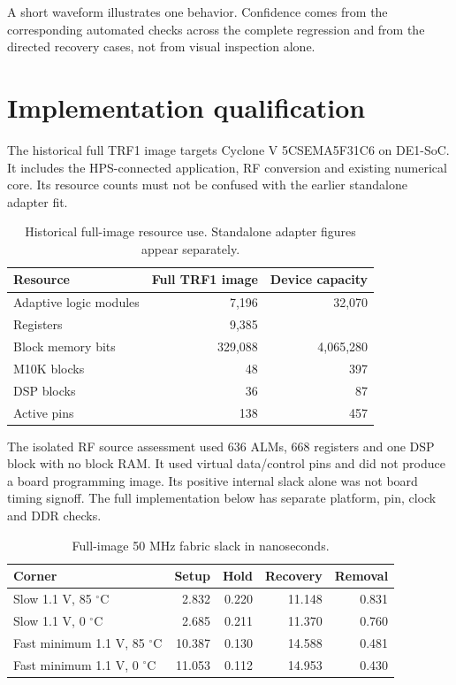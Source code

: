 \documentclass[11pt,letterpaper]{article}
\begin{document}
A short waveform illustrates one behavior. Confidence comes from the corresponding automated checks across the complete regression and from the directed recovery cases, not from visual inspection alone.

\newpage
\section{Implementation qualification}
The historical full TRF1 image targets Cyclone V 5CSEMA5F31C6 on DE1-SoC. It includes the HPS-connected application, RF conversion and existing numerical core. Its resource counts must not be confused with the earlier standalone adapter fit.

\begin{table}[H]\centering\small
\caption{Historical full-image resource use. Standalone adapter figures appear separately.}
\begin{tabular}{@{}lrr@{}}\toprule
Resource & Full TRF1 image & Device capacity \\ \midrule
Adaptive logic modules & 7,196 & 32,070 \\
Registers & 9,385 & \\
Block memory bits & 329,088 & 4,065,280 \\
M10K blocks & 48 & 397 \\
DSP blocks & 36 & 87 \\
Active pins & 138 & 457 \\
\bottomrule\end{tabular}
\end{table}

The isolated RF source assessment used 636 ALMs, 668 registers and one DSP block with no block RAM. It used virtual data/control pins and did not produce a board programming image. Its positive internal slack alone was not board timing signoff. The full implementation below has separate platform, pin, clock and DDR checks.

\begin{table}[H]\centering\small
\caption{Full-image 50 MHz fabric slack in nanoseconds.}
\begin{tabular}{@{}lrrrr@{}}\toprule
Corner & Setup & Hold & Recovery & Removal \\ \midrule
Slow 1.1 V, 85 $^\circ$C & 2.832 & 0.220 & 11.148 & 0.831 \\
Slow 1.1 V, 0 $^\circ$C & 2.685 & 0.211 & 11.370 & 0.760 \\
Fast minimum 1.1 V, 85 $^\circ$C & 10.387 & 0.130 & 14.588 & 0.481 \\
Fast minimum 1.1 V, 0 $^\circ$C & 11.053 & 0.112 & 14.953 & 0.430 \\
\bottomrule\end{tabular}
\end{table}
\end{document}
